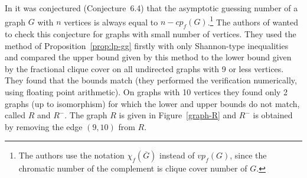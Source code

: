 \documentclass[11pt, a4paper]{kybernetika}
\begin{document}
	In \cite{christofides2011guessing} it was conjectured (Conjecture~6.4) that the asymptotic guessing number of a graph $G$ with $n$ vertices is always equal to $n-cp_f(G)$.\footnote{The authors use the notation $\chi_f(\overline{G})$ instead of $vp_f(G)$, since the chromatic number of the complement is clique cover number of $G$.} The authors of \cite{baber2016graph} wanted to check this conjecture for graphs with small number of vertices. They used the method of Proposition~\ref{prop:lp-gg} firstly with only Shannon-type inequalities and compared the upper bound given by this method to the lower bound given by the fractional clique cover on all undirected graphs with 9 or less vertices. They found that the bounds match (they performed the verification numerically, using  floating point arithmetic). On graphs with 10 vertices they found only 2 graphs (up to isomorphism) for which the lower and upper bounds do not match, called $R$ and $R^-$. The graph $R$ is given in Figure~\ref{graph-R} and $R^-$ is obtained by removing the edge $(9,10)$ from $R$.
	
\end{document}
